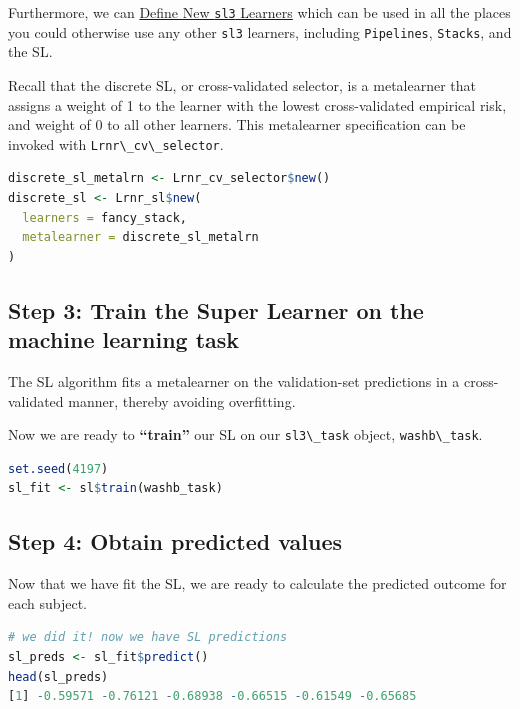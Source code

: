 \documentclass[12pt, krantz2,]{krantz}
\newcommand{\passthrough}[1]{#1}
\theoremstyle{definition}
\theoremstyle{definition}
\theoremstyle{definition}
\newcommand{\1}{\mathbbm{1}}
\begin{document}
Furthermore, we can \href{https://tlverse.org/sl3/articles/custom_lrnrs.html}{Define New \passthrough{\lstinline!sl3!}
Learners} which can be used
in all the places you could otherwise use any other \passthrough{\lstinline!sl3!} learners, including
\passthrough{\lstinline!Pipelines!}, \passthrough{\lstinline!Stacks!}, and the SL.

Recall that the discrete SL, or cross-validated selector, is a metalearner that
assigns a weight of 1 to the learner with the lowest cross-validated empirical
risk, and weight of 0 to all other learners. This metalearner specification can
be invoked with \passthrough{\lstinline!Lrnr\_cv\_selector!}.

\begin{lstlisting}[language=R]
discrete_sl_metalrn <- Lrnr_cv_selector$new()
discrete_sl <- Lrnr_sl$new(
  learners = fancy_stack,
  metalearner = discrete_sl_metalrn
)
\end{lstlisting}

\hypertarget{step-3-train-the-super-learner-on-the-machine-learning-task}{%
\subsection{Step 3: Train the Super Learner on the machine learning task}\label{step-3-train-the-super-learner-on-the-machine-learning-task}}

The SL algorithm fits a metalearner on the validation-set predictions in a
cross-validated manner, thereby avoiding overfitting.

Now we are ready to \textbf{``train''} our SL on our \passthrough{\lstinline!sl3\_task!} object, \passthrough{\lstinline!washb\_task!}.

\begin{lstlisting}[language=R]
set.seed(4197)
sl_fit <- sl$train(washb_task)
\end{lstlisting}

\hypertarget{step-4-obtain-predicted-values}{%
\subsection{Step 4: Obtain predicted values}\label{step-4-obtain-predicted-values}}

Now that we have fit the SL, we are ready to calculate the predicted outcome
for each subject.

\begin{lstlisting}[language=R]
# we did it! now we have SL predictions
sl_preds <- sl_fit$predict()
head(sl_preds)
[1] -0.59571 -0.76121 -0.68938 -0.66515 -0.61549 -0.65685
\end{lstlisting}
\end{document}

